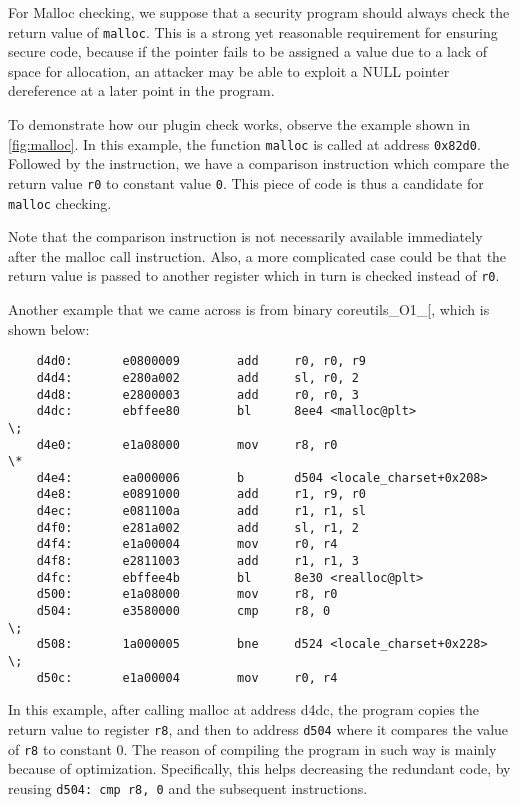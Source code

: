 For Malloc checking, we suppose that a security program should always check the
return value of \texttt{malloc}. This is a strong yet reasonable requirement
for ensuring secure code, because if the pointer fails to be assigned a value
due to a lack of space for allocation, an attacker may be able to
exploit a NULL pointer dereference at a later point in the program.

To demonstrate how our plugin check works, observe the example shown in
\ref{fig:malloc}. In this example, the function \texttt{malloc} is called at
address \texttt{0x82d0}. Followed by the instruction, we have a comparison
instruction which compare the return value \texttt{r0} to constant value
\texttt{0}. This piece of code is thus a candidate for \texttt{malloc}
checking.

Note that the comparison instruction is not necessarily available immediately after
the malloc call instruction. Also, a more complicated case could be that the
return value is passed to another register which in turn is checked
instead of \texttt{r0}.

Another example that we came across is from binary coreutils\_O1\_[, which is
shown below:

\begin{center}
\lstset{language=C,
caption=Malloc disassembly, breaklines=true, basicstyle=\tiny, numbers=none}
\begin{lstlisting}
    d4d0:       e0800009        add     r0, r0, r9
    d4d4:       e280a002        add     sl, r0, 2
    d4d8:       e2800003        add     r0, r0, 3
    d4dc:       ebffee80        bl      8ee4 <malloc@plt>             \;
    d4e0:       e1a08000        mov     r8, r0                        \*
    d4e4:       ea000006        b       d504 <locale_charset+0x208>
    d4e8:       e0891000        add     r1, r9, r0
    d4ec:       e081100a        add     r1, r1, sl
    d4f0:       e281a002        add     sl, r1, 2
    d4f4:       e1a00004        mov     r0, r4
    d4f8:       e2811003        add     r1, r1, 3
    d4fc:       ebffee4b        bl      8e30 <realloc@plt>
    d500:       e1a08000        mov     r8, r0
    d504:       e3580000        cmp     r8, 0                         \;
    d508:       1a000005        bne     d524 <locale_charset+0x228>   \;
    d50c:       e1a00004        mov     r0, r4
\end{lstlisting}
\end{center}
In this example, after calling malloc at address d4dc, the program copies the
return value to register \texttt{r8}, and then to address \texttt{d504} where
it compares the value of \texttt{r8} to constant 0. The reason of compiling the
program in such way is mainly because of optimization. Specifically, this
helps decreasing the redundant code, by reusing \texttt{d504: cmp r8, 0} and
the subsequent instructions.

